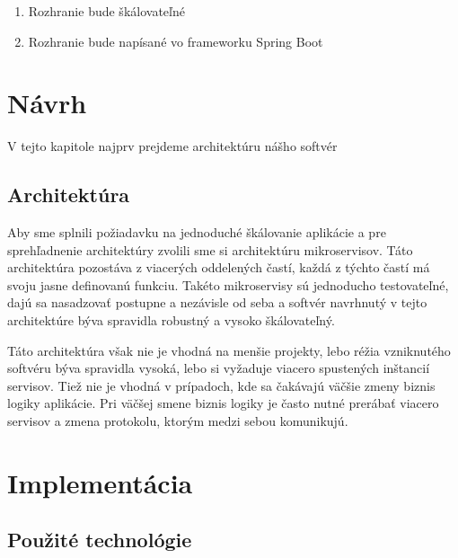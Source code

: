 \begin{enumerate} 

    \item Rozhranie bude škálovateľné 

    \item Rozhranie bude napísané vo frameworku Spring Boot 

\end{enumerate} 

  

\section{Návrh} 

\noindent V tejto kapitole najprv prejdeme architektúru nášho softvér 


  

\subsection{Architektúra} 

\noindent Aby sme splnili požiadavku na jednoduché škálovanie aplikácie a pre sprehľadnenie architektúry zvolili sme si architektúru mikroservisov. Táto architektúra pozostáva z viacerých oddelených častí, každá z týchto častí má svoju jasne definovanú funkciu. Takéto mikroservisy sú jednoducho testovateľné, dajú sa nasadzovať postupne a nezávisle od seba a softvér navrhnutý v tejto architektúre býva spravidla robustný a vysoko škálovateľný.  

  

Táto architektúra však nie je vhodná na menšie projekty, lebo réžia vzniknutého softvéru býva spravidla vysoká, lebo si vyžaduje viacero spustených inštancií servisov. Tiež nie je vhodná v prípadoch, kde sa čakávajú väčšie zmeny biznis logiky aplikácie. Pri väčšej smene biznis logiky je často nutné prerábať viacero servisov a zmena protokolu, ktorým medzi sebou komunikujú. 

  

  

\section{Implementácia} 


  

\subsection{Použité technológie} 

